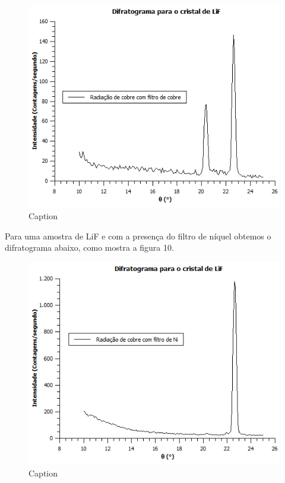\documentclass[article,12pt,openright,oneside,a4paper,brazil]{abntex2}
\begin{document}
\begin{figure}[H]
    \centering
    \includegraphics[scale=0.8]{Figuras/FiltroCu.png}
    \caption{Caption}
    \label{fig:my_label}
\end{figure}

Para uma amostra de LiF e com a presença do filtro de níquel obtemos o difratograma abaixo, como mostra a figura 10.

\begin{figure}[H]
    \centering
    \includegraphics[scale=0.8]{Figuras/FiltroNi.png}
    \caption{Caption}
    \label{fig:my_label}
\end{figure}
\end{document}
